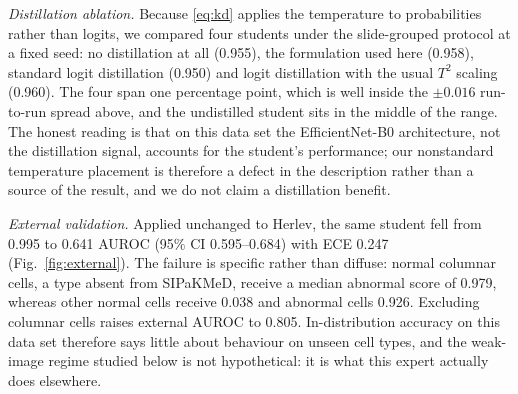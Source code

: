 \documentclass[lettersize,journal]{IEEEtran}
\newcommand{\KDnone}{0.955}
\newcommand{\KDprob}{0.958}
\newcommand{\KDlogit}{0.950}
\newcommand{\KDlogitTT}{0.960}
\begin{document}
\emph{Distillation ablation.} Because \eqref{eq:kd} applies the temperature to probabilities rather than logits, we compared four students under the slide-grouped protocol at a fixed seed: no distillation at all (\KDnone{}), the formulation used here (\KDprob{}), standard logit distillation (\KDlogit{}) and logit distillation with the usual $T^2$ scaling (\KDlogitTT{}). The four span one percentage point, which is well inside the $\pm0.016$ run-to-run spread above, and the undistilled student sits in the middle of the range. The honest reading is that on this data set the EfficientNet-B0 architecture, not the distillation signal, accounts for the student's performance; our nonstandard temperature placement is therefore a defect in the description rather than a source of the result, and we do not claim a distillation benefit.

\begin{table}[t]
\caption{Cytology Expert Across Protocols and Data Sets (Student)}
\label{tab:imgprot}
\centering\footnotesize
\setlength{\tabcolsep}{3.5pt}
\end{table}

\emph{External validation.} Applied unchanged to Herlev, the same student fell from 0.995 to 0.641 AUROC (95\% CI 0.595--0.684) with ECE 0.247 (Fig.~\ref{fig:external}). The failure is specific rather than diffuse: normal columnar cells, a type absent from SIPaKMeD, receive a median abnormal score of 0.979, whereas other normal cells receive 0.038 and abnormal cells 0.926. Excluding columnar cells raises external AUROC to 0.805. In-distribution accuracy on this data set therefore says little about behaviour on unseen cell types, and the weak-image regime studied below is not hypothetical: it is what this expert actually does elsewhere.
\end{document}
